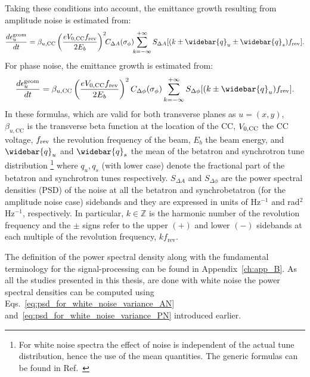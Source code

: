 Taking these conditions into account, the emittance growth resulting from amplitude noise is estimated from:
\begin{equation}\label{eq:dey_an}
    \frac{d\epsilon^{\mathrm{geom}}_u}{dt}  = \beta_{u, \mathrm{CC}} \left( \frac{e\CCvoltage\frev}{2E_b}\right)^2 \!\! C_{\Delta A} (\sigma_{\phi}) \!\! \sum_{k=-\infty}^{+\infty} S_{\Delta A}[(k \pm \widebar{q}_u \pm \widebar{q}_s)\frev].
\end{equation}
For phase noise, the emittance growth is estimated from:
\begin{equation}\label{eq:dey_pn}
    \frac{d\epsilon^{\mathrm{geom}}_u}{dt}  = \beta_{u, \mathrm{CC}}  \left( \frac{e\CCvoltage\frev}{2E_b}\right)^2 C_{\Delta \phi} (\sigma_{\phi}) \sum_{k=-\infty}^{+\infty} S_{\Delta \phi}[(k \pm \widebar{q}_u) \frev].
\end{equation}
In these formulas, which are valid for both transverse planes as $u=(x,y)$, $\beta_{u, \mathrm{CC}}$ is the transverse beta function at the location of the CC, ${V_\mathrm{0, CC}}$ the CC voltage, ${f_\mathrm{rev}}$ the revolution frequency of the beam, $E_b$ the beam energy, and $\widebar{q}_u$ and $\widebar{q}_s$ the mean of the betatron and synchrotron tune distribution \footnote{For white noise spectra the effect of noise is independent of the actual tune distribution, hence the use of the mean quantities. The generic formulas can be found in Ref.~\cite{PhysRevSTAB.18.101001}} where $q_u, q_s$ (with lower case) denote the fractional part of the betatron and synchrotron tunes respectively. $S_{\Delta A}$ and $S_{\Delta \phi}$ are the power spectral densities (PSD) of the noise at all the betatron and synchrobetatron (for the amplitude noise case) sidebands and they are expressed in units of Hz$^{-1}$ and rad$^2$Hz$^{-1}$, respectively. In particular, $k \in \mathbb{Z}$ is the harmonic number of the revolution frequency and the $\pm$ signs refer to the upper $(+)$ and lower $(-)$ sidebands at each multiple of the revolution frequency, $k f_\mathrm{rev}$.%

The definition of the power spectral density along with the fundamental terminology for the signal-processing can be found in Appendix~\ref{ch:app_B}. %
As all the studies presented in this thesis, are done with white noise the power spectral densities can be computed using Eqs.~\eqref{eq:psd_for_white_noise_variance_AN} and~\eqref{eq:psd_for_white_noise_variance_PN} introduced earlier.


